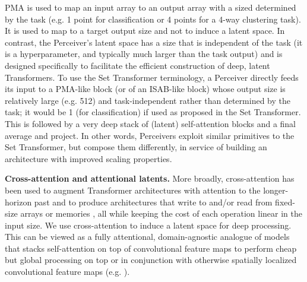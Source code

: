 \documentclass{article}
\begin{document}
PMA is used to map an input array to an output array with a sized determined by the task (e.g. 1 point for classification or 4 points for a 4-way clustering task). It is used to map to a target output size and not to induce a latent space. In contrast, the Perceiver's latent space has a size that is independent of the task (it is a hyperparameter, and typically much larger than the task output) and is designed specifically to facilitate the efficient construction of deep, latent Transformers. To use the Set Transformer terminology, a Perceiver directly feeds its input to a PMA-like block (or  of an ISAB-like block) whose output size is relatively large (e.g. 512) and task-independent rather than determined by the task; it would be 1 (for classification) if used as proposed in the Set Transformer. This is followed by a very deep stack of (latent) self-attention blocks and a final average and project. In other words, Perceivers exploit similar primitives to the Set Transformer, but compose them differently, in service of building an architecture with improved scaling properties.

\noindent \textbf{Cross-attention and attentional latents.}
More broadly, cross-attention has been used to augment Transformer architectures with attention to the longer-horizon past \cite{rae2020compressive, dai2019transformerxl} and to produce architectures that write to and/or read from fixed-size arrays or memories \cite{santoro2018relational, goyal2021coordination}, all while keeping the cost of each operation linear in the input size. We use cross-attention to induce a latent space for deep processing. This can be viewed as a fully attentional, domain-agnostic analogue of models that stacks self-attention on top of convolutional feature maps to perform cheap but global processing on top or in conjunction with otherwise spatially localized convolutional feature maps (e.g. \citealt{carion2020detr, locatello2020object, wang2021maxdeeplab}).
\end{document}
